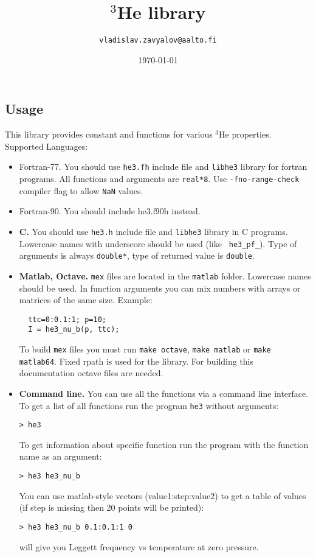 \documentclass[a4paper]{article}
\begin{document}
\title{$^3$He library}
\date{\today}
\author{\tt vladislav.zavyalov@aalto.fi}
\maketitle

\subsection*{Usage}

This library provides constant and functions for various $^3$He properties.
Supported Languages:

\begin{itemize}
\item{Fortran-77.}
You should use {\tt he3.fh} include file and {\tt libhe3} library for
fortran programs. All functions and arguments are {\tt real*8}.
Use {\tt -fno-range-check} compiler flag to allow {\tt NaN} values.

\item{Fortran-90.}
You should include he3.f90h instead.

\item{\bf C.} You should use {\tt he3.h} include file and {\tt libhe3} library
in C programs. Lowercase names with underscore should be used (like {\tt
he3\_pf\_}). Type of arguments is always {\tt double*}, type of returned
value is {\tt double}.

\item{\bf Matlab, Octave.} {\tt mex} files are located in the {\tt matlab}
folder. Lowercase names should be used. In function arguments you can
mix numbers with arrays or matrices of the same size. Example:
\begin{verbatim}
  ttc=0:0.1:1; p=10;
  I = he3_nu_b(p, ttc);
\end{verbatim}
To build {\tt mex} files you must run {\tt make octave}, {\tt make
matlab} or {\tt make matlab64}. Fixed rpath is used for the library. For
building this documentation octave files are needed.

\item{\bf Command line.} You can use all the functions via a command line interface.
To get a list of all functions run the program {\tt he3} without arguments:
\begin{verbatim}
> he3
\end{verbatim}
To get information about specific function run the program with the
function name as an argument:
\begin{verbatim}
> he3 he3_nu_b
\end{verbatim}
You can use matlab-style vectors (value1:step:value2) to get a table
of values (if step is missing then 20 points will be printed):
\begin{verbatim}
> he3 he3_nu_b 0.1:0.1:1 0
\end{verbatim}
will give you Leggett frequency vs temperature at zero pressure.

\end{itemize}
\end{document}
